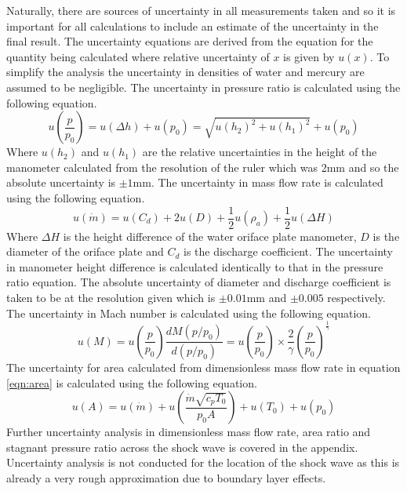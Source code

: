 \documentclass{article}
\begin{document}
Naturally, there are sources of uncertainty in all measurements taken and so it is important for all calculations to include an estimate of the uncertainty in the final result.
The uncertainty equations are derived from the equation for the quantity being calculated where relative uncertainty of $x$ is given by $u(x)$.
To simplify the analysis the uncertainty in densities of water and mercury are assumed to be negligible.
The uncertainty in pressure ratio is calculated using the following equation.
\begin{equation}
    u\left( \frac{p}{p_0} \right) = u(\Delta h) + u(p_0) = \sqrt{u(h_2)^2+u(h_1)^2} + u(p_0)
\end{equation}
Where $u(h_2)$ and $u(h_1)$ are the relative uncertainties in the height of the manometer calculated from the resolution of the ruler which was 2mm and so the absolute uncertainty is $\pm 1$mm.
The uncertainty in mass flow rate is calculated using the following equation.
\begin{equation}
    u(\dot{m}) = u(C_d) + 2u(D) + \frac{1}{2}u(\rho_a) + \frac{1}{2}u(\Delta H)
\end{equation}
Where $\Delta H$ is the height difference of the water oriface plate manometer, $D$ is the diameter of the oriface plate and $C_d$ is the discharge coefficient.
The uncertainty in manometer height difference is calculated identically to that in the pressure ratio equation.
The absolute uncertainty of diameter and discharge coefficient is taken to be at the resolution given which is $\pm 0.01$mm and $\pm 0.005$ respectively.
The uncertainty in Mach number is calculated using the following equation.
\begin{equation}
    u(M) = u\left( \frac{p}{p_0} \right) \frac{d M ( p/p_0 ) }{d (p/p_0)} = u\left(\frac{p}{p_0}\right) \times \frac{2}{\gamma}  \left( \frac{p}{p_0} \right) ^ {\frac{1}{\gamma}}
\end{equation}
The uncertainty for area calculated from dimensionless mass flow rate in equation \ref{eqn:area} is calculated using the following equation.
\begin{equation}
    u(A) = u(\dot{m}) + u\left(\frac{\dot{m}\sqrt{c_pT_0}}{p_0A}\right) + u(T_0) + u(p_0)
\end{equation}
Further uncertainty analysis in dimensionless mass flow rate, area ratio and stagnant pressure ratio across the shock wave is covered in the appendix.
Uncertainty analysis is not conducted for the location of the shock wave as this is already a very rough approximation due to boundary layer effects.
\end{document}

